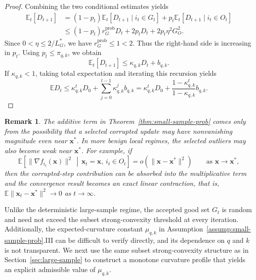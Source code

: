 \documentclass[11pt]{article}
\newcommand{\ve}[1]{\mathbf{#1}}
\newtheorem{rem}{Remark}
\begin{document}
\begin{proof}
Combining the two conditional estimates yields
\begin{align*}
\mathbb{E}_t[D_{t+1}]
&=
(1-p_t)\mathbb{E}_t[D_{t+1}\mid i_t\in G_t]
+
p_t\mathbb{E}_t[D_{t+1}\mid i_t\in O_t] \\
&\le
(1-p_t)r_G^{\mathrm{prob}}D_t
+
2p_t D_t
+
2p_t\eta^2G_O^2.
\end{align*}
Since \(0<\eta\le 2/{L_G^*}\),
we have \(r_G^{\mathrm{prob}}\le 1<2\).
Thus the right-hand side is increasing in \(p_t\). Using \(p_t\le \pi_{q,k}\),
we obtain
\[
\mathbb{E}_t[D_{t+1}]
\le
\kappa_{q,k}D_t+b_{q,k}.
\]
If \(\kappa_{q,k}<1\), taking total expectation and iterating this
recursion yields
\[
\mathbb E D_t
\le
\kappa_{q,k}^tD_0
+
\sum_{j=0}^{t-1}\kappa_{q,k}^j b_{q,k}
=
\kappa_{q,k}^tD_0
+
\frac{1-\kappa_{q,k}^t}{1-\kappa_{q,k}}b_{q,k}.
\]
\end{proof}

\begin{rem}
The additive term in Theorem~\ref{thm:small-sample-prob} comes only from the
possibility that a selected corrupted update may have nonvanishing magnitude
even near \(\ve{x}^*\). In more benign local regimes, the selected outliers may
also become weak near \(\ve{x}^*\). For example, if
\[
\mathbb{E}\!\left[
\|\nabla f_{i_t}(\ve{x})\|^2
\,\middle|\,
\ve{x}_t=\ve{x},\ i_t\in O_t
\right]
=
o(\|\ve{x}-\ve{x}^*\|^2)
\qquad\text{as }\ve{x}\to\ve{x}^*,
\]
then the corrupted-step contribution can be absorbed into the multiplicative
term and the convergence result becomes an exact linear contraction, that is, $\mathbb{E}\|\ve{x}_t-\ve{x}^*\|^2 \to 0$ as $t \to \infty$.
\end{rem}

Unlike the deterministic large-sample regime, the accepted good set \(G_t\)
is random and need not exceed the subset strong-convexity threshold at every
iteration. Additionally, the expected-curvature constant \(\mu_{q,k}\) in
Assumption~\ref{assump:small-sample-prob}.III can be difficult to verify
directly, and its dependence on \(q\) and \(k\) is not transparent. We next
use the same subset strong-convexity structure as in
Section~\ref{sec:large-sample} to construct a monotone curvature profile that
yields an explicit admissible value of \(\mu_{q,k}\).
\end{document}
